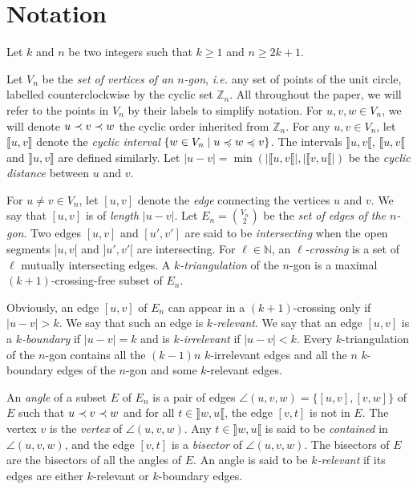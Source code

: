 \documentclass[12pt]{amsart}
\begin{document}


\section{Notation}\label{sectionnotation}

Let $k$ and $n$ be two integers such that $k\ge 1$ and $n\ge 2k+1$.

Let $V_n$ be the \emph{set of vertices of an $n$-gon}, {\it i.e.} any set of points of the unit circle, labelled counterclockwise by the cyclic set $\mathbb{Z}_n$.
All throughout the paper, we will refer to the points in $V_n$ by their labels to simplify notation.
For $u,v,w\in V_n$, we will denote $u\prec v\prec w$ the cyclic order inherited from $\mathbb{Z}_n$.
For any $u,v\in V_n$, let $\llbracket u,v\rrbracket$ denote the \emph{cyclic interval} $\{w\in V_n\;|\; u\preccurlyeq w\preccurlyeq v\}$.
The intervals $\rrbracket u,v\llbracket$, $\llbracket u,v\llbracket$ and $\rrbracket u,v\rrbracket$ are defined similarly.
Let $|u-v|=\min(|\llbracket u, v\llbracket|,|\llbracket v, u\llbracket|)$ be the \emph{cyclic distance} between $u$ and $v$.

For $u\ne v\in V_n$, let $[u,v]$ denote the \emph{edge} connecting the vertices $u$ and $v$. We say that $[u,v]$ is of \emph{length} $|u-v|$.
Let $E_n={V_n \choose 2}$ be the \emph{set of edges of the $n$-gon}.
Two edges $[u,v]$ and $[u',v']$ are said to be \emph{intersecting} when the open segments $]u,v[$ and $]u',v'[$ are intersecting.
For $\ell\in\mathbb{N}$, an \emph{$\ell$-crossing} is a set of $\ell$ mutually intersecting edges.
A \emph{$k$-triangulation} of the $n$-gon is a maximal $(k+1)$-crossing-free subset of $E_n$.

Obviously, an edge $[u,v]$ of $E_n$ can appear in a $(k+1)$-crossing only if $|u-v|>k$. We say that such an edge is \emph{$k$-relevant}. We say that an edge $[u,v]$ is a \emph{$k$-boundary} if $|u-v|=k$ and is \emph{$k$-irrelevant} if $|u-v|<k$.
Every $k$-triangulation of the $n$-gon contains all the $(k-1)n$ $k$-irrelevant edges and all the $n$ $k$-boundary edges of the $n$-gon and some $k$-relevant edges.

An \emph{angle} of a subset $E$ of $E_n$ is a pair of edges $\angle(u,v,w)=\{[u,v],[v,w]\}$ of $E$ such that $u\prec v\prec w$ and for all $t\in\rrbracket w,u\llbracket$, the edge $[v,t]$ is not in $E$. The vertex $v$ is the \emph{vertex} of $\angle(u,v,w)$. Any $t\in\rrbracket w,u\llbracket$ is said to be \emph{contained} in $\angle(u,v,w)$, and the edge $[v,t]$ is a \emph{bisector} of $\angle(u,v,w)$.
The bisectors of $E$ are the bisectors of all the angles of $E$.
An angle is said to be \emph{$k$-relevant} if its edges are either $k$-relevant or $k$-boundary edges.
\end{document}
